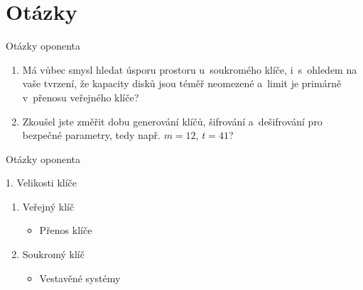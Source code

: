 \documentclass{beamer}
\begin{document}
\section{Otázky}
\begin{frame}{Otázky oponenta}

    \begin{enumerate}

            \pause
        \item Má vůbec smysl hledat úsporu prostoru u~soukromého klíče,
            i~s~ohledem na vaše tvrzení, že kapacity disků jsou téměř neomezené
            a~limit je primárně v~přenosu veřejného klíče?

            \pause
        \item Zkoušel jste změřit dobu generování klíčů, šifrování a~dešifrování
            pro bezpečné parametry, tedy např. $m=12$, $t=41$?

    \end{enumerate}


\end{frame}

\begin{frame}{Otázky oponenta}

    \begin{block}{1. Velikosti klíče}
        \begin{enumerate}

                \pause
            \item Veřejný klíč
                \begin{itemize}
                    \item Přenos klíče
                \end{itemize}

                \pause
            \item Soukromý klíč
                \begin{itemize}
                    \item Vestavěné systémy
                \end{itemize}

        \end{enumerate}
    \end{block}

\end{frame}
\end{document}
